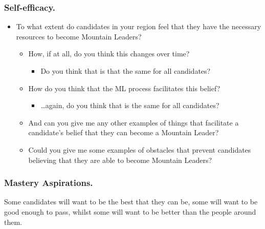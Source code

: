 \documentclass[
  12pt,
  a4paper,
]{book}
\providecommand{\tightlist}{%
  \setlength{\itemsep}{0pt}\setlength{\parskip}{0pt}}
\begin{document}
\hypertarget{self-efficacy.}{%
\subsubsection{Self-efficacy.}\label{self-efficacy.}}

\begin{itemize}
\tightlist
\item
  To what extent do candidates in your region feel that they have the necessary resources to become Mountain Leaders?

  \begin{itemize}
  \tightlist
  \item
    How, if at all, do you think this changes over time?

    \begin{itemize}
    \tightlist
    \item
      Do you think that is that the same for all candidates?
    \end{itemize}
  \item
    How do you think that the ML process facilitates this belief?

    \begin{itemize}
    \tightlist
    \item
      \ldots again, do you think that is the same for all candidates?
    \end{itemize}
  \item
    And can you give me any other examples of things that facilitate a candidate's belief that they can become a Mountain Leader?
  \item
    Could you give me some examples of obstacles that prevent candidates believing that they are able to become Mountain Leaders?
  \end{itemize}
\end{itemize}

\hypertarget{mastery-aspirations.}{%
\subsubsection{Mastery Aspirations.}\label{mastery-aspirations.}}

Some candidates will want to be the best that they can be, some will want to be good enough to pass, whilst some will want to be better than the people around them.
\end{document}

